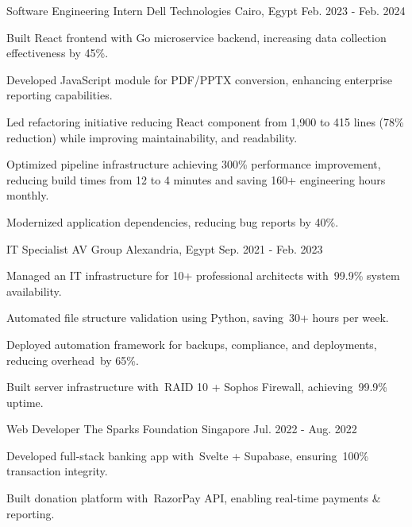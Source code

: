 \begin{cventries}
  \cventry
   {Software Engineering Intern} %
    {Dell Technologies} %
    {Cairo, Egypt} %
    {Feb. 2023 - Feb. 2024} %
    {
      \begin{cvitems} %
        \item {Built React frontend with Go microservice backend, increasing data collection effectiveness by 45\%.}
        \item {Developed JavaScript module for PDF/PPTX conversion, enhancing enterprise reporting capabilities.}
        \item {Led refactoring initiative reducing React component from 1,900 to 415 lines (78\% reduction) while improving maintainability, and readability.}
        \item{Optimized pipeline infrastructure achieving 300\% performance improvement, reducing build times from 12 to 4 minutes and saving 160+ engineering hours monthly.}
        \item{Modernized application dependencies, reducing bug reports by 40\%.}
      \end{cvitems}
    }
    
     \cventry
    {IT Specialist} %
    {AV Group} %
    {Alexandria, Egypt} %
    {Sep. 2021 - Feb. 2023} %
    {
      \begin{cvitems} %
      \item{Managed an IT infrastructure for 10+ professional architects with 99.9\% system availability.}
        \item {Automated file structure validation using Python, saving 30+ hours per week.}
        \item {Deployed automation framework for backups, compliance, and deployments, reducing overhead by 65\%.}
        \item {Built server infrastructure with RAID 10 + Sophos Firewall, achieving 99.9\% uptime.}
      \end{cvitems}
    }
    
    
    \cventry
    {Web Developer} %
    {The Sparks Foundation} %
    {Singapore} %
    {Jul. 2022 - Aug. 2022} %
    {
      \begin{cvitems} %
        \item {Developed full-stack banking app with Svelte + Supabase, ensuring 100\% transaction integrity.}
        \item {Built donation platform with RazorPay API, enabling real-time payments \& reporting.}
      \end{cvitems}
    }


\end{cventries}
